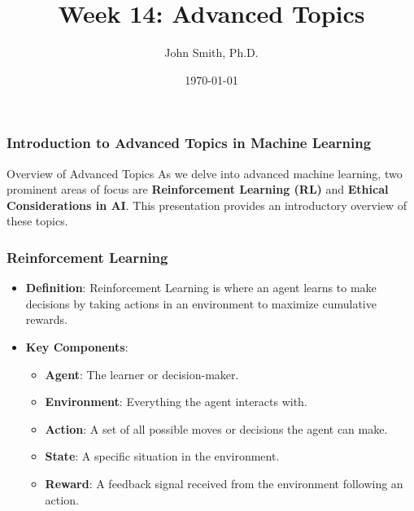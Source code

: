 \documentclass[aspectratio=169]{beamer}
\title[Advanced Topics]{Week 14: Advanced Topics}
\author[]{John Smith, Ph.D.}
\date{\today}
\begin{document}
\frame{\titlepage}

\begin{frame}[fragile]
    \frametitle{Introduction to Advanced Topics in Machine Learning}
    \begin{block}{Overview of Advanced Topics}
        As we delve into advanced machine learning, two prominent areas of focus are \textbf{Reinforcement Learning (RL)} and \textbf{Ethical Considerations in AI}. This presentation provides an introductory overview of these topics.
    \end{block}
\end{frame}

\begin{frame}[fragile]
    \frametitle{Reinforcement Learning}
    \begin{itemize}
        \item \textbf{Definition}: Reinforcement Learning is where an agent learns to make decisions by taking actions in an environment to maximize cumulative rewards.
        \item \textbf{Key Components}:
            \begin{itemize}
                \item \textbf{Agent}: The learner or decision-maker.
                \item \textbf{Environment}: Everything the agent interacts with.
                \item \textbf{Action}: A set of all possible moves or decisions the agent can make.
                \item \textbf{State}: A specific situation in the environment.
                \item \textbf{Reward}: A feedback signal received from the environment following an action.
            \end{itemize}
    \end{itemize}
\end{frame}
\end{document}
